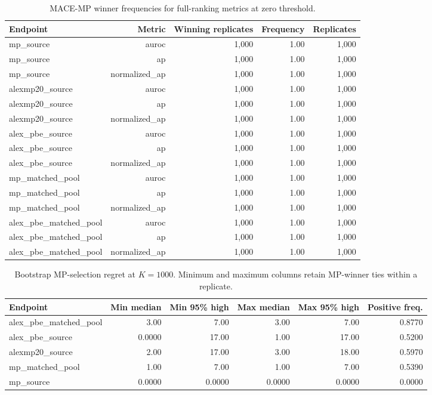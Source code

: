 \begin{table}[H]
\centering
\sitablefont
\caption{MACE-MP winner frequencies for full-ranking metrics at zero threshold.}
\label{tab:v3-global-winner}
\begin{adjustbox}{max width=\linewidth}
\begin{tabular}{@{}lrrrr@{}}
\toprule
Endpoint & Metric & Winning replicates & Frequency & Replicates \\
\midrule
mp\_source & auroc & 1,000 & 1.00 & 1,000 \\
mp\_source & ap & 1,000 & 1.00 & 1,000 \\
mp\_source & normalized\_ap & 1,000 & 1.00 & 1,000 \\
alexmp20\_source & auroc & 1,000 & 1.00 & 1,000 \\
alexmp20\_source & ap & 1,000 & 1.00 & 1,000 \\
alexmp20\_source & normalized\_ap & 1,000 & 1.00 & 1,000 \\
alex\_pbe\_source & auroc & 1,000 & 1.00 & 1,000 \\
alex\_pbe\_source & ap & 1,000 & 1.00 & 1,000 \\
alex\_pbe\_source & normalized\_ap & 1,000 & 1.00 & 1,000 \\
mp\_matched\_pool & auroc & 1,000 & 1.00 & 1,000 \\
mp\_matched\_pool & ap & 1,000 & 1.00 & 1,000 \\
mp\_matched\_pool & normalized\_ap & 1,000 & 1.00 & 1,000 \\
alex\_pbe\_matched\_pool & auroc & 1,000 & 1.00 & 1,000 \\
alex\_pbe\_matched\_pool & ap & 1,000 & 1.00 & 1,000 \\
alex\_pbe\_matched\_pool & normalized\_ap & 1,000 & 1.00 & 1,000 \\
\bottomrule
\end{tabular}
\end{adjustbox}
\end{table}


\begin{table}[H]
\centering
\sitablefont
\caption{Bootstrap MP-selection regret at $K=1000$. Minimum and maximum columns retain MP-winner ties within a replicate.}
\label{tab:v3-regret}
\begin{adjustbox}{max width=\linewidth}
\begin{tabular}{@{}lrrrrr@{}}
\toprule
Endpoint & Min median & Min 95\% high & Max median & Max 95\% high & Positive freq. \\
\midrule
alex\_pbe\_matched\_pool & 3.00 & 7.00 & 3.00 & 7.00 & 0.8770 \\
alex\_pbe\_source & 0.0000 & 17.00 & 1.00 & 17.00 & 0.5200 \\
alexmp20\_source & 2.00 & 17.00 & 3.00 & 18.00 & 0.5970 \\
mp\_matched\_pool & 1.00 & 7.00 & 1.00 & 7.00 & 0.5390 \\
mp\_source & 0.0000 & 0.0000 & 0.0000 & 0.0000 & 0.0000 \\
\bottomrule
\end{tabular}
\end{adjustbox}
\end{table}


